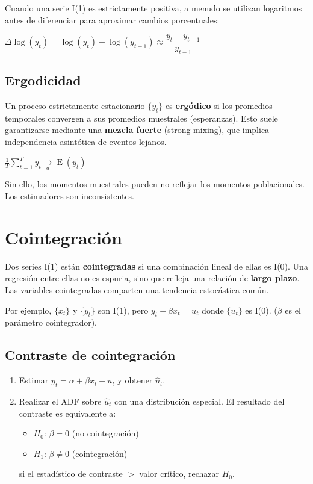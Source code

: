 \documentclass[10pt, a4paper, landscape]{article}
\DeclareMathOperator{\E}{E}
\begin{document}
\begin{multicols}{3}
Cuando una serie I(1) es estrictamente positiva, a menudo se utilizan logaritmos antes de diferenciar para aproximar cambios porcentuales:

\begin{center}
	\( \Delta \log(y_{t}) = \log(y_{t}) - \log(y_{t - 1}) \approx \dfrac{y_t - y_{t - 1}} {y_{t - 1}} \)
\end{center}

\columnbreak

\subsection*{Ergodicidad}

Un proceso estrictamente estacionario \( \{ y_{t} \} \) es \textbf{ergódico} si los promedios temporales convergen a sus promedios muestrales (esperanzas). Esto suele garantizarse mediante una \textbf{mezcla fuerte} (strong mixing), que implica independencia asintótica de eventos lejanos.

\begin{center}
	\( \frac{1}{T} \sum_{t = 1}^{T} y_{t} \underset{a}{\rightarrow} \E(y_{t}) \)
\end{center}

Sin ello, los momentos muestrales pueden no reflejar los momentos poblacionales. Los estimadores son inconsistentes.

\section*{Cointegración}

Dos series I(1) están \textbf{cointegradas} si una combinación lineal de ellas es I(0). Una regresión entre ellas no es espuria, sino que refleja una relación de \textbf{largo plazo}. Las variables cointegradas comparten una tendencia estocástica común.

Por ejemplo, \( \{ x_{t} \} \) y \( \{ y_{t} \} \) son I(1), pero \( y_{t} - \beta x_{t} = u_{t} \) donde \( \{ u_{t} \} \) es I(0). (\( \beta \) es el parámetro cointegrador).

\subsection*{Contraste de cointegración}

\begin{enumerate}[leftmargin=*]
	\item Estimar \( y_{t} = \alpha + \beta x_{t} + u_{t} \) y obtener \( \hat{u}_{t} \).
	\item Realizar el ADF sobre \( \hat{u}_{t} \) con una distribución especial.
	El resultado del contraste es equivalente a:
	\begin{itemize}[leftmargin=*]
		\item \( H_{0} \): \( \beta = 0 \) (no cointegración)
		\item \( H_{1} \): \( \beta \neq 0 \) (cointegración)
	\end{itemize}
	si el estadístico de contraste \( > \) valor crítico, rechazar \( H_{0} \).
\end{enumerate}


\end{multicols}
\end{document}
